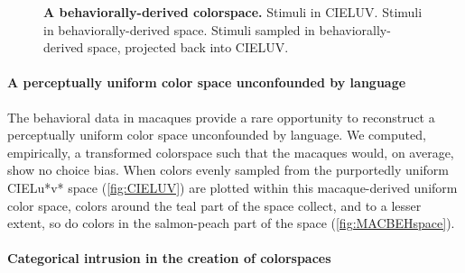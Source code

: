 \begin{figure}
    \centering
    \begin{subfigure}[b]{0.3\textwidth}
         \centering
         \caption{}
         
         \label{fig:CIELUV}
    \end{subfigure}
    \hfill
    \begin{subfigure}[b]{0.3\textwidth}
         \centering
         \caption{}
         
         \label{fig:MACBEHspace}
    \end{subfigure}
    \hfill
    \begin{subfigure}[b]{0.3\textwidth}
         \centering
         \caption{}
         
         \label{fig:UniformStimsInCIELUV}
    \end{subfigure}
           \caption{\textbf{A behaviorally-derived colorspace.} Stimuli in CIELUV. Stimuli in behaviorally-derived space. Stimuli sampled in behaviorally-derived space, projected back into CIELUV.}
        \label{fig:MACBEHcolorspace}
    
\end{figure}


\paragraph{A perceptually uniform color space unconfounded by language}

The behavioral data in macaques provide a rare opportunity to reconstruct a perceptually uniform color space unconfounded by language. 
We computed, empirically, a transformed colorspace such that the macaques would, on average, show no choice bias.
When colors evenly sampled from the purportedly uniform CIELu*v* space (\autoref{fig:CIELUV}) are plotted within this macaque-derived uniform color space, colors around the teal part of the space collect, and to a lesser extent, so do colors in the salmon-peach part of the space (\autoref{fig:MACBEHspace}). 

\paragraph{Categorical intrusion in the creation of colorspaces}

